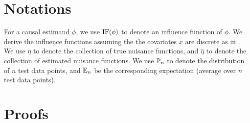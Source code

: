 

\section{Notations}\label{appe:sec:notation}
For a causal estimand $\phi$, we use $\text{IF}(\phi)$ to denote an influence function of $\phi$.
We derive the influence functions assuming the the covariates $x$ are discrete as in \cite{kennedy2022semiparametric}.
We use ${\eta}$ to denote the collection of true nuisance functions, and $\hat{\eta}$ to denote the collection of estimated nuisance functions.
We use $\mathbb{P}_n$ to denote the distribution of $n$ test data points, and $\mathbb{E}_n$ be the corresponding expectation (average over $n$ test data points).

\section{Proofs}\label{appe:sec:proof}
